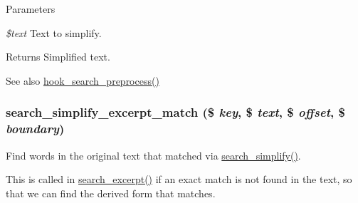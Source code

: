 \begin{DoxyParams}{Parameters}
\item[{\em \$text}]Text to simplify.\end{DoxyParams}
\begin{DoxyReturn}{Returns}
Simplified text.
\end{DoxyReturn}
\begin{DoxySeeAlso}{See also}
\hyperlink{group__search_ga3c935c295da9103bc7184f6ec869c533}{hook\_\-search\_\-preprocess()} 
\end{DoxySeeAlso}
\hypertarget{search_8module_a1224b2795f1334faa26bbb552f4f5856}{
\subsubsection[{search\_\-simplify\_\-excerpt\_\-match}]{\setlength{\rightskip}{0pt plus 5cm}search\_\-simplify\_\-excerpt\_\-match (\$ {\em key}, \/  \$ {\em text}, \/  \$ {\em offset}, \/  \$ {\em boundary})}}
\label{search_8module_a1224b2795f1334faa26bbb552f4f5856}
Find words in the original text that matched via \hyperlink{search_8module_ac33f1e93d9bed7ebf9b4908287618beb}{search\_\-simplify()}.

This is called in \hyperlink{group__search_gaa77622185b2d7ea771cf590d76ab3ba4}{search\_\-excerpt()} if an exact match is not found in the text, so that we can find the derived form that matches.


